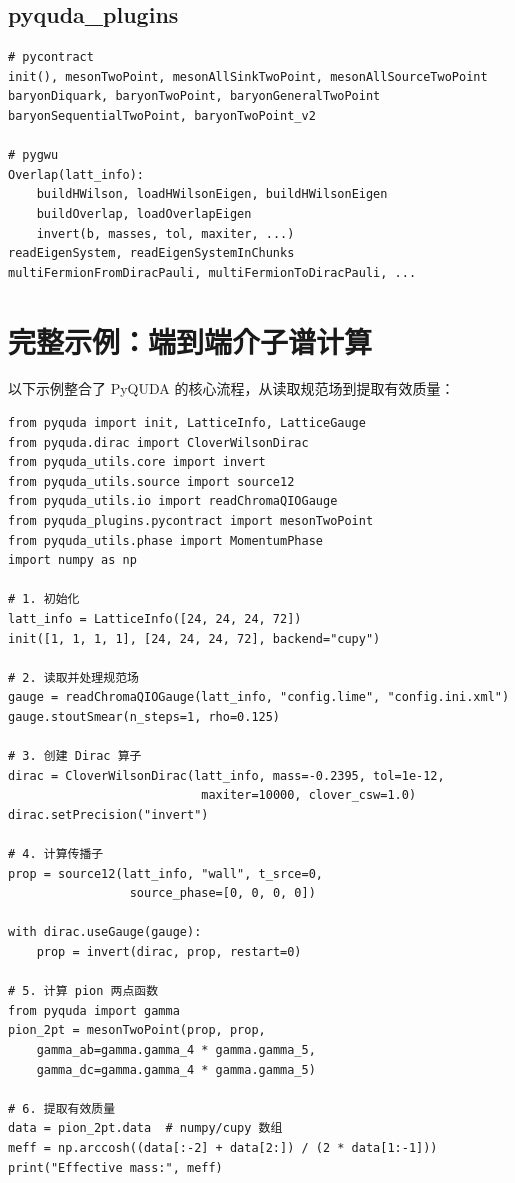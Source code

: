 \documentclass[12pt,a4paper]{ctexart}
\begin{document}
\subsection{pyquda\_plugins}

\begin{lstlisting}[style=pycode]
# pycontract
init(), mesonTwoPoint, mesonAllSinkTwoPoint, mesonAllSourceTwoPoint
baryonDiquark, baryonTwoPoint, baryonGeneralTwoPoint
baryonSequentialTwoPoint, baryonTwoPoint_v2

# pygwu
Overlap(latt_info):
    buildHWilson, loadHWilsonEigen, buildHWilsonEigen
    buildOverlap, loadOverlapEigen
    invert(b, masses, tol, maxiter, ...)
readEigenSystem, readEigenSystemInChunks
multiFermionFromDiracPauli, multiFermionToDiracPauli, ...
\end{lstlisting}

\section{完整示例：端到端介子谱计算}

以下示例整合了 PyQUDA 的核心流程，从读取规范场到提取有效质量：

\begin{lstlisting}[style=pycode]
from pyquda import init, LatticeInfo, LatticeGauge
from pyquda.dirac import CloverWilsonDirac
from pyquda_utils.core import invert
from pyquda_utils.source import source12
from pyquda_utils.io import readChromaQIOGauge
from pyquda_plugins.pycontract import mesonTwoPoint
from pyquda_utils.phase import MomentumPhase
import numpy as np

# 1. 初始化
latt_info = LatticeInfo([24, 24, 24, 72])
init([1, 1, 1, 1], [24, 24, 24, 72], backend="cupy")

# 2. 读取并处理规范场
gauge = readChromaQIOGauge(latt_info, "config.lime", "config.ini.xml")
gauge.stoutSmear(n_steps=1, rho=0.125)

# 3. 创建 Dirac 算子
dirac = CloverWilsonDirac(latt_info, mass=-0.2395, tol=1e-12,
                           maxiter=10000, clover_csw=1.0)
dirac.setPrecision("invert")

# 4. 计算传播子
prop = source12(latt_info, "wall", t_srce=0,
                 source_phase=[0, 0, 0, 0])

with dirac.useGauge(gauge):
    prop = invert(dirac, prop, restart=0)

# 5. 计算 pion 两点函数
from pyquda import gamma
pion_2pt = mesonTwoPoint(prop, prop,
    gamma_ab=gamma.gamma_4 * gamma.gamma_5,
    gamma_dc=gamma.gamma_4 * gamma.gamma_5)

# 6. 提取有效质量
data = pion_2pt.data  # numpy/cupy 数组
meff = np.arccosh((data[:-2] + data[2:]) / (2 * data[1:-1]))
print("Effective mass:", meff)
\end{lstlisting}
\end{document}
